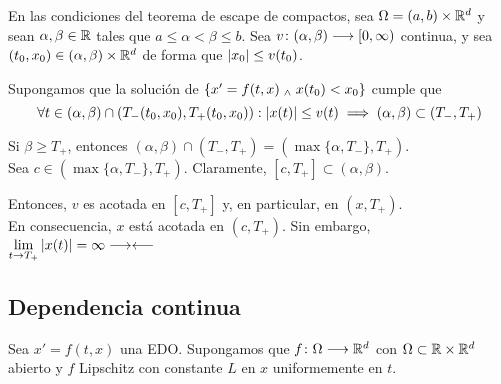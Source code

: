 \begin{cor}
	En las condiciones del teorema de escape de compactos, sea $\Omega = (a, b) \times \mathbb{R}^d$ y sean $\alpha, \beta \in \mathbb{R}$ tales que $a \leq \alpha < \beta \leq b$. Sea $v \colon (\alpha, \beta) \longrightarrow [0, \infty)$ continua, y sea $(t_0, x_0) \in (\alpha, \beta) \times \mathbb{R}^d$ de forma que $\left|x_0\right| \leq v(t_0)$.
	
	Supongamos que la solución de $\{x'=f(t, x) \; _{\wedge} \; x(t_0) < x_0\}$ cumple que
	\[\forall t \in (\alpha, \beta) \cap (T_-(t_0, x_0), T_+(t_0, x_0)) : \left|x(t)\right| \leq v(t) \implies (\alpha, \beta) \subset (T_-, T_+)\]
	\begin{dem}
		Si $\beta \geq T_+$, entonces $(\alpha, \beta)\cap (T_-, T_+) = (\max\{\alpha, T_-\}, T_+)$. \\
		Sea $c\in (\max\{\alpha, T_-\}, T_+)$. Claramente, $[c, T_+]\subset(\alpha, \beta)$.

		Entonces, $v$ es acotada en $[c, T_+]$  y, en particular, en $(x, T_+)$.\\
		En consecuencia, $x$ está acotada en $(c, T_+)$. Sin embargo, $\displaystyle \lim_{t\to T_+} |x(t)| = \infty \longrightarrow\longleftarrow$
	\end{dem}
\end{cor}

\subsection{Dependencia continua}

Sea $x'=f(t, x)$ una EDO. Supongamos que $f \colon \Omega \longrightarrow \mathbb{R}^d$ con $\Omega \subset \mathbb{R}\times\mathbb{R}^d$ abierto y $f$ Lipschitz con constante $L$ en $x$ uniformemente en $t$.

